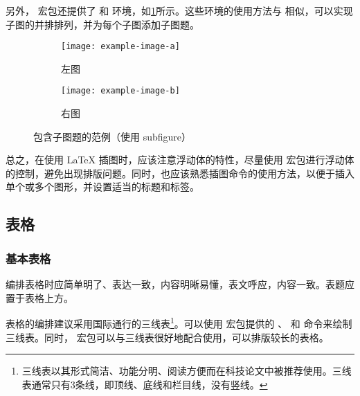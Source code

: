 另外， 宏包还提供了  和  环境，如\cref{fig:subfigure}所示。这些环境的使用方法与  相似，可以实现子图的并排排列，并为每个子图添加子图题。

\begin{figure}[!htp]
  \centering
  \begin{subfigure}{0.3\textwidth}
    \centering
    \texttt{[image: example-image-a]}
    \caption{左图}
  \end{subfigure}
  \hspace{1cm}
  \begin{subfigure}{0.4\textwidth}
    \centering
    \texttt{[image: example-image-b]}
    \caption{右图}
  \end{subfigure}
  \caption{包含子图题的范例（使用 subfigure）}
  \label{fig:subfigure}
\end{figure}



总之，在使用 \LaTeX{} 插图时，应该注意浮动体的特性，尽量使用  宏包进行浮动体的控制，避免出现排版问题。同时，也应该熟悉插图命令的使用方法，以便于插入单个或多个图形，并设置适当的标题和标签。


\subsection{表格}

\subsubsection{基本表格}

编排表格时应简单明了、表达一致，内容明晰易懂，表文呼应，内容一致。表题应置于表格上方。

表格的编排建议采用国际通行的三线表\footnote{三线表以其形式简洁、功能分明、阅读方便而在科技论文中被推荐使用。三线表通常只有3条线，即顶线、底线和栏目线，没有竖线。}。可以使用  宏包提供的 、 和  命令来绘制三线表。同时， 宏包可以与三线表很好地配合使用，可以排版较长的表格。

